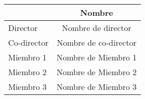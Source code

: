 \begin{table}[htbp]
    \centering
    \begin{tabular}{lc}
        \toprule
        & Nombre \\
        \midrule
        Director &  Nombre de director\\
        Co-director &  Nombre de co-director\\
        Miembro 1 &  Nombre de Miembro 1\\
        Miembro 2 &  Nombre de Miembro 2\\
        Miembro 3 &  Nombre de Miembro 3\\
        \bottomrule
    \end{tabular}%
\end{table}%
